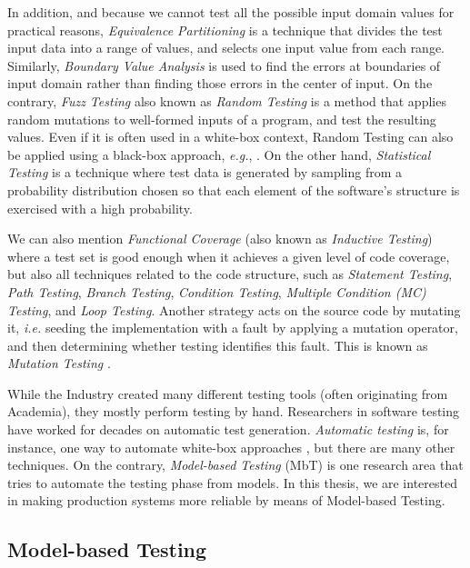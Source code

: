 In addition, and because we cannot test all the possible input
domain values for practical reasons, \emph{Equivalence
Partitioning} \cite{Huang13} is a technique that divides the test
input data into a range of values, and selects one input value
from each range. Similarly, \emph{Boundary Value Analysis}
\cite{Ramachandran:2003:TSC:942796.943301} is used to find the
errors at boundaries of input domain rather than finding those
errors in the center of input. On the contrary, \emph{Fuzz
Testing} also known as \emph{Random Testing}
\cite{Duran:1981:RRT:800078.802530,Godefroid08automatedwhitebox}
is a method that applies random mutations to well-formed inputs
of a program, and test the resulting values. Even if it is often
used in a white-box context, Random Testing can also be applied
using a black-box approach, \emph{e.g.}, \cite{5387827}. On the
other hand, \emph{Statistical Testing}
\cite{Walton:1995:STS:210453.210458} is a technique where test
data is generated by sampling from a probability distribution
chosen so that each element of the software's structure is
exercised with a high probability.

We can also mention \emph{Functional Coverage} (also known as
\emph{Inductive Testing})
\cite{Walkinshaw:2010:IFC:1928028.1928038} where a test set is
good enough when it achieves a given level of code coverage, but
also all techniques related to the code structure, such as
\emph{Statement Testing}, \emph{Path Testing}, \emph{Branch
Testing}, \emph{Condition Testing}, \emph{Multiple Condition (MC)
Testing}, and \emph{Loop Testing}. Another strategy acts on the
source code by mutating it, \emph{i.e.} seeding the
implementation with a fault by applying a mutation operator, and
then determining whether testing identifies this fault. This is
known as \emph{Mutation Testing} \cite{1702444}.

While the Industry created many different testing tools (often
originating from Academia), they mostly perform testing by hand.
Researchers in software testing have worked for decades on
automatic test generation. \emph{Automatic testing}  is, for
instance, one way to automate white-box approaches \cite{pex},
but there are many other techniques. On the contrary,
\emph{Model-based Testing} (MbT) \cite{Jorgensen:1995:STC:526521}
is one research area that tries to automate the testing phase
from models. In this thesis, we are interested in making
production systems more reliable by means of Model-based Testing.

\subsection{Model-based Testing}
\label{sec:related:testing:mbt}

